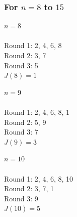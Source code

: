 \subsubsection{For $n=8$ to $15$}
\par\vspace{6pt}\noindent
\begin{minipage}[t]{0.32\linewidth}\centering
\textbf{$n=8$}\\[3pt]
{}\\[3pt]
{\scriptsize Round 1: 2, 4, 6, 8\\ Round 2: 3, 7\\ Round 3: 5\\ $J(8)=1$}
\end{minipage}\hfill
\begin{minipage}[t]{0.32\linewidth}\centering
\textbf{$n=9$}\\[3pt]
{}\\[3pt]
{\scriptsize Round 1: 2, 4, 6, 8, 1\\ Round 2: 5, 9\\ Round 3: 7\\ $J(9)=3$}
\end{minipage}\hfill
\begin{minipage}[t]{0.32\linewidth}\centering
\textbf{$n=10$}\\[3pt]
{}\\[3pt]
{\scriptsize Round 1: 2, 4, 6, 8, 10\\ Round 2: 3, 7, 1\\ Round 3: 9\\ $J(10)=5$}
\end{minipage}\par\vspace{6pt}

